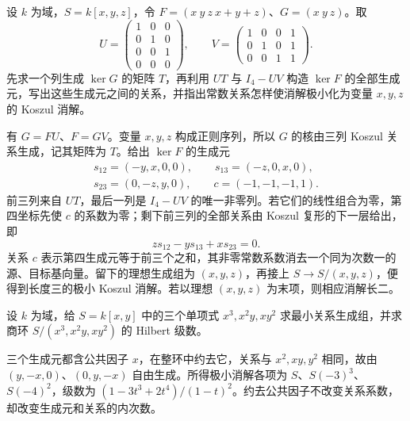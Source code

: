 \begin{exercise}\label{b3:ex:21-redundant-original-generators}
	设 \(k\) 为域，\(S=k[x,y,z]\)，令 \(F=(x\ y\ z\ x+y+z)\)、\(G=(x\ y\ z)\)。取
	\[
		U=\begin{pmatrix}1&0&0\\0&1&0\\0&0&1\\0&0&0\end{pmatrix},
		\qquad
		V=\begin{pmatrix}1&0&0&1\\0&1&0&1\\0&0&1&1\end{pmatrix}.
	\]
	先求一个列生成 \(\ker G\) 的矩阵 \(T\)，再利用 \(UT\) 与 \(I_4-UV\) 构造 \(\ker F\) 的全部生成元，写出这些生成元之间的关系，并指出常数关系怎样使消解极小化为变量 \(x,y,z\) 的 Koszul 消解。
\end{exercise}
\begin{solution}
	有 \(G=FU\)、\(F=GV\)。变量 \(x,y,z\) 构成正则序列，所以 \(G\) 的核由三列 Koszul 关系生成，记其矩阵为 \(T\)。给出 \(\ker F\) 的生成元
	\[
		\begin{gathered}
			s_{12}=(-y,x,0,0),\qquad s_{13}=(-z,0,x,0),\\
			s_{23}=(0,-z,y,0),\qquad c=(-1,-1,-1,1).
		\end{gathered}
	\]
	前三列来自 \(UT\)，最后一列是 \(I_4-UV\) 的唯一非零列。若它们的线性组合为零，第四坐标先使 \(c\) 的系数为零；剩下前三列的全部关系由 Koszul 复形的下一层给出，即
	\[
		z s_{12}-y s_{13}+x s_{23}=0.
	\]
	关系 \(c\) 表示第四生成元等于前三个之和，其非零常数系数消去一个同为次数一的源、目标基向量。留下的理想生成组为 \((x,y,z)\)，再接上 \(S\to S/(x,y,z)\)，便得到长度三的极小 Koszul 消解。若以理想 \((x,y,z)\) 为末项，则相应消解长二。
\end{solution}

\begin{exercise}\label{b3:ex:21-divisibility-relations}
	设 \(k\) 为域，给 \(S=k[x,y]\) 中的三个单项式 \(x^3,x^2y,xy^2\) 求最小关系生成组，并求商环 \(S/(x^3,x^2y,xy^2)\) 的 Hilbert 级数。
\end{exercise}
\begin{solution}
	三个生成元都含公共因子 \(x\)，在整环中约去它，关系与 \(x^2,xy,y^2\) 相同，故由 \((y,-x,0)\)、\((0,y,-x)\) 自由生成。所得极小消解各项为 \(S\)、\(S(-3)^3\)、\(S(-4)^2\)，级数为 \((1-3t^3+2t^4)/(1-t)^2\)。约去公共因子不改变关系系数，却改变生成元和关系的内次数。
\end{solution}

